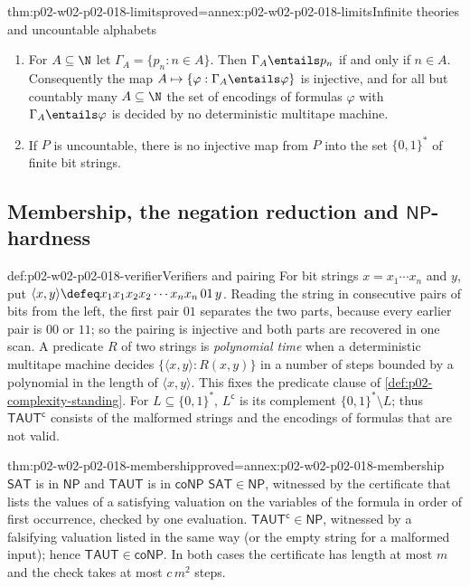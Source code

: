 \begin{hbtheorem}{thm:p02-w02-p02-018-limits}{proved=annex:p02-w02-p02-018-limits}{Infinite theories and uncountable alphabets}
\begin{enumerate}
\item For \(A\subseteq\N\) let \(\Gamma_A=\{p_n:n\in A\}\).  Then
      \(\Gamma_A\entails p_n\) if and only if \(n\in A\).  Consequently
      the map \(A\mapsto\{\varphi:\Gamma_A\entails\varphi\}\) is injective,
      and for all but countably many \(A\subseteq\N\) the set of encodings
      of formulas \(\varphi\) with \(\Gamma_A\entails\varphi\) is decided by no
      deterministic multitape machine.
\item If \(P\) is uncountable, there is no injective map from \(P\) into the
      set \(\{0,1\}^*\) of finite bit strings.
\end{enumerate}
\end{hbtheorem}

\subsection{Membership, the negation reduction and \texorpdfstring{\(\mathsf{NP}\)}{NP}-hardness}
\label{sec:p02-w02-p02-018-complexity}

\begin{hbconvention}{def:p02-w02-p02-018-verifier}{Verifiers and pairing}
For bit strings \(x=x_1\cdots x_n\) and \(y\), put
\(\langle x,y\rangle\defeq x_1x_1x_2x_2\cdots x_nx_n\,01\,y\).  Reading
the string in consecutive pairs of bits from the left, the first pair
\(01\) separates the two parts, because every earlier pair is \(00\) or
\(11\); so the pairing is injective and both parts are recovered in one
scan.  A predicate
\(R\) of two strings is \emph{polynomial time} when a deterministic multitape
machine decides \(\{\langle x,y\rangle:R(x,y)\}\) in a number of steps bounded
by a polynomial in the length of \(\langle x,y\rangle\).  This fixes the
predicate clause of \cref{def:p02-complexity-standing}.  For
\(L\subseteq\{0,1\}^*\), \(L^{\mathsf c}\) is its complement
\(\{0,1\}^*\setminus L\); thus \(\mathsf{TAUT}^{\mathsf c}\) consists of the
malformed strings and the encodings of formulas that are not valid.
\end{hbconvention}

\begin{hbtheorem}{thm:p02-w02-p02-018-membership}{proved=annex:p02-w02-p02-018-membership}{\(\mathsf{SAT}\) is in \(\mathsf{NP}\) and \(\mathsf{TAUT}\) is in \(\mathsf{coNP}\)}
\(\mathsf{SAT}\in\mathsf{NP}\), witnessed by the certificate that lists the
values of a satisfying valuation on the variables of the formula in order of
first occurrence, checked by one evaluation.  \(\mathsf{TAUT}^{\mathsf c}\in
\mathsf{NP}\), witnessed by a falsifying valuation listed in the same way (or
the empty string for a malformed input); hence \(\mathsf{TAUT}\in
\mathsf{coNP}\).  In both cases the certificate has length at most \(m\) and
the check takes at most \(c\,m^{2}\) steps.
\end{hbtheorem}

